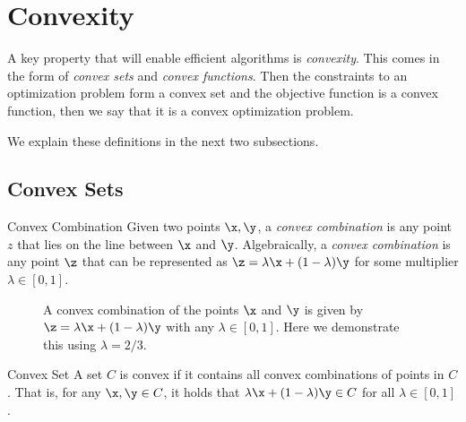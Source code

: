 \section{Convexity}
A key property that will enable efficient algorithms is \emph{convexity}.  This comes in the form of \emph{convex sets} and \emph{convex functions}.  Then the constraints to an optimization problem form a  convex set and the objective function is a convex function, then we say that it is a convex optimization problem.

We explain these definitions in the next two subsections.
\subsection{Convex Sets}

\begin{definition}{Convex Combination}{}
Given two points $\x,\y$, a \emph{convex combination} is any point $z$ that lies on the line between $\x$ and $\y$.  Algebraically, a \emph{convex combination} is any point $\z$ that can be represented as $\z = \lambda \x + (	1-\lambda) \y $ for some multiplier $\lambda \in [0,1]$.
\end{definition}

\begin{figure}[h]
\begin{center}
\end{center}
\caption{A convex combination of the points $\x$ and $\y$ is given by $\z = \lambda \x + (1-\lambda)\y$ with any $\lambda \in [0,1]$.  Here we demonstrate this using $\lambda = 2/3$.  }
\end{figure}



\begin{definition}{Convex Set}{}
A set $C$ is convex if it contains all convex combinations of points in $C$.  That is, for any $\x,\y \in C$, it holds that $ \lambda \x + (1-\lambda) \y \in C$ for all $\lambda \in [0,1]$.
\end{definition}


